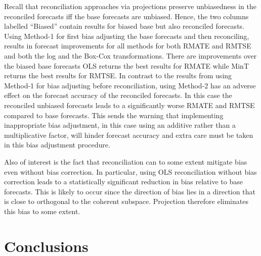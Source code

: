 \documentclass[12pt]{article}
\theoremstyle{definition}
\begin{document}
Recall that reconciliation approaches via projections preserve unbiasedness in the reconciled forecasts iff the base forecasts are unbiased. Hence, the two columns labelled ``Biased'' contain results for biased base but also reconciled forecasts. Using Method-1 for first bias adjusting the base forecasts and then reconciling, results in forecast improvements for all methods {\color{blue} for both RMATE and RMTSE and} both the log and the Box-Cox transformations.  {\color{blue}There are improvements over the biased base forecasts OLS returns the best results for RMATE while MinT returns the best results for RMTSE.} In contrast to the results from using Method-1 for bias adjusting before reconciliation, using Method-2 has an adverse effect on the forecast accuracy of the reconciled forecasts. In this case the reconciled unbiased forecasts {\color{blue}leads to a significantly worse RMATE and RMTSE compared to base forecasts.} This sends the warning that implementing inappropriate bias adjustment, in this case using an additive rather than a multiplicative factor, will hinder forecast accuracy and extra care must be taken in this bias adjustment procedure.

{\color{blue} Also  of interest is the fact that reconciliation can to some extent mitigate bias even without bias correction.  In particular, using OLS reconciliation without bias correction leads to a statistically significant reduction in bias relative to base forecasts.  This is likely to occur since the direction of bias lies in a direction that is close to orthogonal to the coherent subspace.  Projection therefore eliminates this bias to some extent.}

\section{Conclusions}\label{sec:conclusions}

\end{document}
